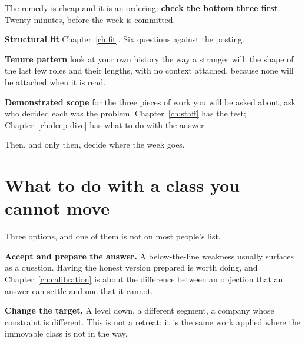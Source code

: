 
The remedy is cheap and it is an ordering: \textbf{check the bottom three
first}. Twenty minutes, before the week is committed.

\begin{kitmethod}
\textbf{Structural fit} \dash{} Chapter~\ref{ch:fit}. Six questions against the
posting.

\textbf{Tenure pattern} \dash{} look at your own history the way a stranger
will: the shape of the last few roles and their lengths, with no context
attached, because none will be attached when it is read.

\textbf{Demonstrated scope} \dash{} for the three pieces of work you will be
asked about, ask who decided each was the problem. Chapter~\ref{ch:staff} has
the test; Chapter~\ref{ch:deep-dive} has what to do with the answer.

Then, and only then, decide where the week goes.
\end{kitmethod}


\section{What to do with a class you cannot move}

Three options, and one of them is not on most people's list.

\textbf{Accept and prepare the answer.} A below-the-line weakness usually
surfaces as a question. Having the honest version prepared is worth doing, and
Chapter~\ref{ch:calibration} is about the difference between an objection that
an answer can settle and one that it cannot.

\textbf{Change the target.} A level down, a different segment, a company whose
constraint is different. This is not a retreat; it is the same work applied
where the immovable class is not in the way.

